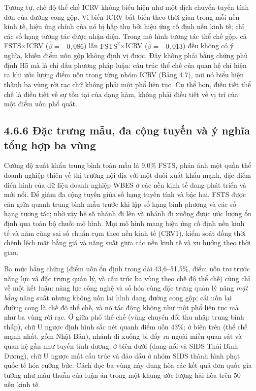 \documentclass[
  a4paper,
  13pt]{extreport}
\begin{document}
Tương tự, chế độ thể chế ICRV không biểu hiện như một dịch chuyển tuyến
tính đơn của đường cong gộp. Vì biến ICRV bất biến theo thời gian trong
mỗi nền kinh tế, hiệu ứng chính của nó bị hấp thụ bởi hiệu ứng cố định
nền kinh tế; chỉ các số hạng tương tác được nhận diện. Trong mô hình
tương tác thể chế gộp, cả FSTS×ICRV (\(\hat{\beta} = -0{,}086\)) lẫn
\(\text{FSTS}^2\)×ICRV (\(\hat{\beta} = -0{,}013\)) đều không có ý
nghĩa, khiến điểm uốn gộp không định vị được. Đây không phải bằng chứng
phủ định H5 mà là chỉ dấu phương pháp luận: cấu trúc thể chế của quan hệ
chỉ hiện ra khi ước lượng điểm uốn trong từng nhóm ICRV (Bảng 4.7), nơi
nó biểu hiện thành ba vùng rời rạc chứ không phải một phổ liên tục. Cụ
thể hơn, điều tiết thể chế là điều tiết về sự tồn tại của dạng hàm,
không phải điều tiết về vị trí của một điểm uốn phổ quát.

\hypertarget{ux111ux1eb7c-trux1b0ng-mux1eabu-ux111a-cux1ed9ng-tuyux1ebfn-vuxe0-uxfd-nghux129a-tux1ed5ng-hux1ee3p-ba-vuxf9ng}{%
\subsection{4.6.6 Đặc trưng mẫu, đa cộng tuyến và ý nghĩa tổng hợp ba
vùng}\label{ux111ux1eb7c-trux1b0ng-mux1eabu-ux111a-cux1ed9ng-tuyux1ebfn-vuxe0-uxfd-nghux129a-tux1ed5ng-hux1ee3p-ba-vuxf9ng}}

Cường độ xuất khẩu trung bình toàn mẫu là 9,0\% FSTS, phản ánh một quần
thể doanh nghiệp thiên về thị trường nội địa với một đuôi xuất khẩu
mạnh, đặc điểm điển hình của dữ liệu doanh nghiệp WBES ở các nền kinh tế
đang phát triển và mới nổi. Để giảm đa cộng tuyến giữa số hạng tuyến
tính và bậc hai, FSTS được căn giữa quanh trung bình mẫu trước khi lập
số hạng bình phương và các số hạng tương tác; nhờ vậy hệ số nhánh đi lên
và nhánh đi xuống được ước lượng ổn định qua toàn bộ chuỗi mô hình. Mọi
mô hình mang hiệu ứng cố định nền kinh tế và năm cùng sai số chuẩn cụm
theo nền kinh tế (CRV1), kiểm soát đồng thời chênh lệch mặt bằng giá và
năng suất giữa các nền kinh tế và xu hướng theo thời gian.

Ba mức bằng chứng (điểm uốn ổn định trong dải 43,6--51,5\%, điểm uốn trơ
trước năng lực và đặc trưng quản lý, và cấu trúc ba vùng theo chế độ thể
chế) cùng chỉ về một kết luận: năng lực công nghệ và số hóa cùng đặc
trưng quản lý nâng \emph{mặt bằng} năng suất nhưng không uốn lại hình
dạng đường cong gộp; cái uốn lại đường cong là chế độ thể chế, và nó tác
động không như một phổ liên tục mà như ba vùng rời rạc. Ở giữa phổ thể
chế (vùng chuyển đổi thu nhập trung bình thấp), chữ U ngược định hình
sắc nét quanh điểm uốn 43\%; ở biên trên (thể chế mạnh nhất, gồm Nhật
Bản), nhánh đi xuống bị đẩy ra ngoài miền quan sát và quan hệ gần như
tuyến tính dương; ở biên dưới (đang nổi và SIDS Thái Bình Dương), chữ U
ngược mất cấu trúc và đảo dấu ở nhóm SIDS thành hình phạt quốc tế hóa
cưỡng bức. Cách đọc ba vùng này dung hòa các kết quả đơn quốc gia tưởng
như mâu thuẫn của luận án trong một khung ước lượng hài hòa trên 50 nền
kinh tế.
\end{document}
